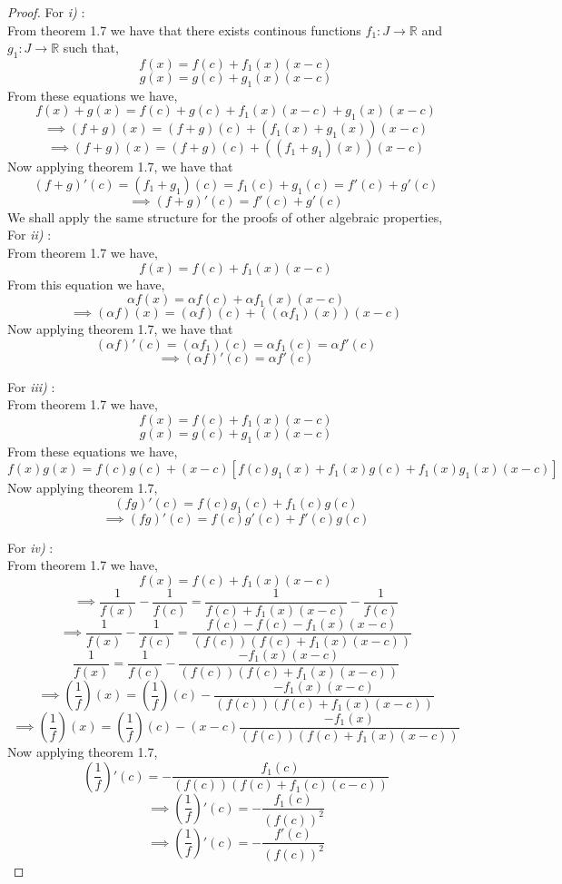 \documentclass[11pt,a4paper]{colorart}
\def\l{\left}
\def\r{\right}
\def\R{\mathbb{R}}
\def\a{\alpha}
\def\ra{\rightarrow}
\begin{document}
\begin{proof}
	For \textit{i)} :\\
	From theorem 1.7 we have that there exists continous functions $f_1:J\ra\R$ and $g_1:J\ra\R$ such that,
	\[ f(x) = f(c) + f_1(x)  (x-c) \]
	\[ g(x) = g(c) + g_1(x)  (x-c) \]
	From these equations we have,
	\[ f(x) + g(x) = f(c) + g(c) + f_1(x)  (x-c) + g_1(x) (x-c) \]
	\[ \implies (f+g)(x) = (f+g)(c) +  ( f_1(x)  + g_1(x) ) (x-c) \]
	\[ \implies (f+g)(x) = (f+g)(c) +  ((f_1+g_1)(x)) (x-c) \]
	Now applying theorem 1.7, we have that
	\[ (f+g)'(c) = (f_1+g_1)(c) = f_1(c) + g_1(c) = f'(c) + g'(c) \]
	\[ \implies (f+g)'(c) = f'(c) + g'(c) \]
	We shall apply the same structure for the proofs of other algebraic properties,\\
	For \textit{ii)} :\\
	From theorem 1.7 we have,
	\[ f(x) = f(c) + f_1(x)  (x-c) \]
	From this equation we have,
	\[ \a f(x) = \a f(c) + \a f_1(x)  (x-c) \]
	\[ \implies (\a f)(x) = (\a f)(c) + ( (\a f_1)(x) ) (x-c) \]
	Now applying theorem 1.7, we have that
	\[ (\a f)'(c) = (\a f_1)(c) = \a f_1(c) = \a f'(c) \]
	\[ \implies (\a f)'(c) = \a f'(c) \]

	For \textit{iii)} :\\
	From theorem 1.7 we have,
	\[ f(x) = f(c) + f_1(x)  (x-c) \]
	\[ g(x) = g(c) + g_1(x)  (x-c) \]
	From these equations we have,
	\[ f(x)g(x) = f(c)g(c) + (x-c) \l[ f(c)g_1(x) + f_1(x)g(c) + f_1(x)g_1(x)(x-c) \r] \]
	Now applying theorem 1.7,
	\[ (fg)'(c) = f(c)g_1(c) + f_1(c)g(c) \]
	\[ \implies (fg)'(c) = f(c)g'(c) + f'(c)g(c) \]

	For \textit{iv)} :\\
	From theorem 1.7 we have,
	\[ f(x) = f(c) + f_1(x)  (x-c) \]
	\[ \implies \frac{1}{f(x)} - \frac{1}{f(c)} = \frac{1}{f(c)+f_1(x)(x-c)} -\frac{1}{f(c)} \]
	\[ \implies \frac{1}{f(x)} - \frac{1}{f(c)} =  \frac{f(c)-f(c)-f_1(x)(x-c)}{(f(c))(f(c)+f_1(x)(x-c))}\]
	\[ \frac{1}{f(x)} = \frac{1}{f(c)} -  \frac{-f_1(x)(x-c)}{(f(c))(f(c)+f_1(x)(x-c))}\]
	\[ \implies \l(\frac{1}{f}\r)(x) = \l(\frac{1}{f}\r)(c) -  \frac{-f_1(x)(x-c)}{(f(c))(f(c)+f_1(x)(x-c))}\]
	\[ \implies \l(\frac{1}{f}\r)(x) = \l(\frac{1}{f}\r)(c) -  (x-c)\frac{-f_1(x)}{(f(c))(f(c)+f_1(x)(x-c))}\]
	Now applying theorem 1.7,
	\[ \l(\frac{1}{f}\r)'(c) = -  \frac{f_1(c)}{(f(c))(f(c)+f_1(c)(c-c))} \]
	\[ \implies \l(\frac{1}{f}\r)'(c) = -  \frac{f_1(c)}{(f(c))^2} \]
	\[ \implies \l(\frac{1}{f}\r)'(c) = -  \frac{f'(c)}{(f(c))^2} \]
\end{proof}
\end{document}
